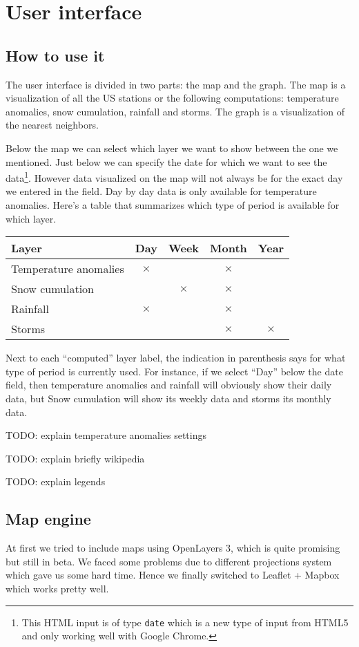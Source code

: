 \section{User interface}
\subsection{How to use it}
The user interface is divided in two parts: the map and the graph. The map is a visualization of all the US stations or the following computations: temperature anomalies, snow cumulation, rainfall and storms. The graph is a visualization of the nearest neighbors.

Below the map we can select which layer we want to show between the one we mentioned. Just below we can specify the date for which we want to see the data\footnote{This HTML input is of type \texttt{date} which is a new type of input from HTML5 and only working well with Google Chrome.}. However data visualized on the map will not always be for the exact day we entered in the field. Day by day data is only available for temperature anomalies. Here's a table that summarizes which type of period is available for which layer.
\begin{center}
\begin{tabular}{|l|c|c|c|c|}\hline \textbf{Layer} & \textbf{Day} & \textbf{Week} & \textbf{Month} & \textbf{Year} \\\hline Temperature anomalies & $\times$ &  & $\times$ &  \\\hline Snow cumulation &  & $\times$ & $\times$ &  \\\hline Rainfall & $\times$ &  & $\times$ &  \\\hline Storms &  &  & $\times$ & $\times$ \\\hline \end{tabular}
\end{center}

Next to each “computed” layer label, the indication in parenthesis says for what type of period is currently used. For instance, if we select “Day” below the date field, then temperature anomalies and rainfall will obviously show their daily data, but Snow cumulation will show its weekly data and storms its monthly data.

TODO: explain temperature anomalies settings

TODO: explain briefly wikipedia

TODO: explain legends

\subsection{Map engine}
At first we tried to include maps using OpenLayers 3, which is quite promising but still in beta. We faced some problems due to different projections system which gave us some hard time. Hence we finally switched to Leaflet + Mapbox which works pretty well.
